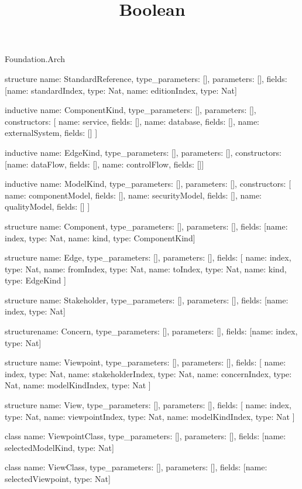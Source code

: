 \begin{lexlean}{Foundation.Arch}
\title{Boolean}
\begin{semanticmodule}
structure{
  name: StandardReference,
  type_parameters: [],
  parameters: [],
  fields: [{name: standardIndex, type: Nat}, {name: editionIndex, type: Nat}]
}

inductive{
  name: ComponentKind,
  type_parameters: [],
  parameters: [],
  constructors: [
    {name: service, fields: []},
    {name: database, fields: []},
    {name: externalSystem, fields: []}
  ]
}

inductive{
  name: EdgeKind,
  type_parameters: [],
  parameters: [],
  constructors: [{name: dataFlow, fields: []}, {name: controlFlow, fields: []}]
}

inductive{
  name: ModelKind,
  type_parameters: [],
  parameters: [],
  constructors: [
    {name: componentModel, fields: []},
    {name: securityModel, fields: []},
    {name: qualityModel, fields: []}
  ]
}

structure{
  name: Component,
  type_parameters: [],
  parameters: [],
  fields: [{name: index, type: Nat}, {name: kind, type: ComponentKind}]
}

structure{
  name: Edge,
  type_parameters: [],
  parameters: [],
  fields: [
    {name: index, type: Nat},
    {name: fromIndex, type: Nat},
    {name: toIndex, type: Nat},
    {name: kind, type: EdgeKind}
  ]
}

structure{
  name: Stakeholder,
  type_parameters: [],
  parameters: [],
  fields: [{name: index, type: Nat}]
}

structure{name: Concern, type_parameters: [], parameters: [], fields: [{name: index, type: Nat}]}

structure{
  name: Viewpoint,
  type_parameters: [],
  parameters: [],
  fields: [
    {name: index, type: Nat},
    {name: stakeholderIndex, type: Nat},
    {name: concernIndex, type: Nat},
    {name: modelKindIndex, type: Nat}
  ]
}

structure{
  name: View,
  type_parameters: [],
  parameters: [],
  fields: [
    {name: index, type: Nat},
    {name: viewpointIndex, type: Nat},
    {name: modelKindIndex, type: Nat}
  ]
}

class{
  name: ViewpointClass,
  type_parameters: [],
  parameters: [],
  fields: [{name: selectedModelKind, type: Nat}]
}

class{
  name: ViewClass,
  type_parameters: [],
  parameters: [],
  fields: [{name: selectedViewpoint, type: Nat}]
}


\end{semanticmodule}
\end{lexlean}
